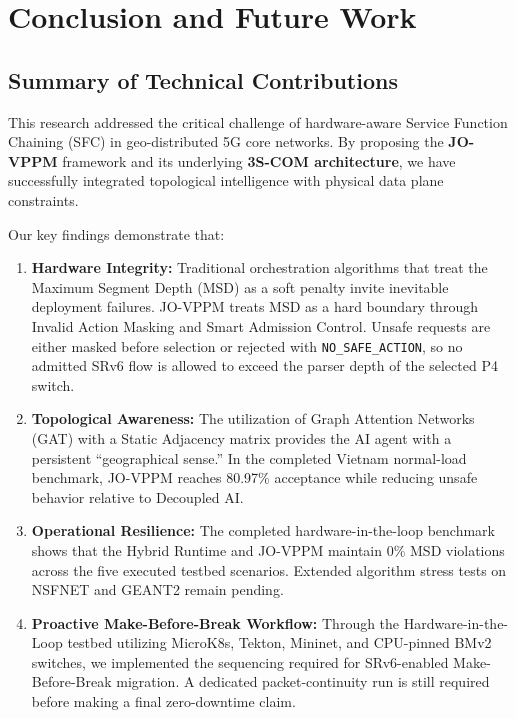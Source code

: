 \documentclass[12pt, a4paper, reqno, oneside]{book}
\begin{document}
\chapter{Conclusion and Future Work}
\label{chap:conclusions}

\section{Summary of Technical Contributions}
This research addressed the critical challenge of hardware-aware Service Function Chaining (SFC) in geo-distributed 5G core networks. By proposing the \textbf{JO-VPPM} framework and its underlying \textbf{3S-COM architecture}, we have successfully integrated topological intelligence with physical data plane constraints. 

Our key findings demonstrate that:
\begin{enumerate}
    \item \textbf{Hardware Integrity:} Traditional orchestration algorithms that treat the Maximum Segment Depth (MSD) as a soft penalty invite inevitable deployment failures. JO-VPPM treats MSD as a hard boundary through Invalid Action Masking and Smart Admission Control. Unsafe requests are either masked before selection or rejected with \texttt{NO\_SAFE\_ACTION}, so no admitted SRv6 flow is allowed to exceed the parser depth of the selected P4 switch.
    \item \textbf{Topological Awareness:} The utilization of Graph Attention Networks (GAT) with a Static Adjacency matrix provides the AI agent with a persistent ``geographical sense.'' In the completed Vietnam normal-load benchmark, JO-VPPM reaches 80.97\% acceptance while reducing unsafe behavior relative to Decoupled AI.
    \item \textbf{Operational Resilience:} The completed hardware-in-the-loop benchmark shows that the Hybrid Runtime and JO-VPPM maintain 0\% MSD violations across the five executed testbed scenarios. Extended algorithm stress tests on NSFNET and GEANT2 remain pending.
    \item \textbf{Proactive Make-Before-Break Workflow:} Through the Hardware-in-the-Loop testbed utilizing MicroK8s, Tekton, Mininet, and CPU-pinned BMv2 switches, we implemented the sequencing required for SRv6-enabled Make-Before-Break migration. A dedicated packet-continuity run is still required before making a final zero-downtime claim.
\end{enumerate}
\end{document}
